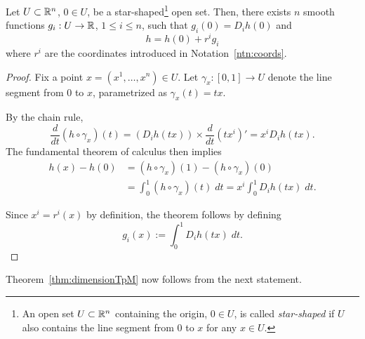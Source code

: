 \begin{lemma}\label{lem:Taylor}
  Let $U\subset\mathbb{R}^n$, $0\in U$, be a star-shaped\footnote{An open set $U\subset\mathbb{R}^n$ containing the origin, $0\in U$, is called \emph{star-shaped} if $U$ also contains the line segment from $0$ to $x$ for any $x\in U$.} open set.
  Then, there exists $n$ smooth functions $g_i: U \to \mathbb{R}$, $1\leq i \leq n$, such that $g_i(0) = D_i h(0)$ and
  \begin{equation}
    h = h(0) + r^i g_i
  \end{equation}
  where $r^i$ are the coordinates introduced in Notation~\ref{ntn:coords}.
\end{lemma}
\begin{proof}
  Fix a point $x = (x^1, \ldots, x^n) \in U$.
  Let $\gamma_x:[0,1]\to U$ denote the line segment from $0$ to $x$, parametrized as $\gamma_x(t) = tx$.

  By the chain rule,
  \begin{equation}
    \frac{d}{dt}(h \circ \gamma_x) (t) = \left(D_i h(t x)\right) \times \frac{d}{dt} (t x^i)' = x^i D_i h(t x).
  \end{equation}
  The fundamental theorem of calculus then implies
  \begin{align}
    h(x) - h(0) &= (h \circ \gamma_x)(1) - (h \circ \gamma_x)(0) \\
    &= \int_0^1 (h \circ \gamma_x)(t)\;dt = x^i \int_0^1 D_i h(tx)\; dt.
  \end{align}

  Since $x^i = r^i(x)$ by definition, the theorem follows by defining
  \begin{equation}
    g_i(x) := \int_0^1 D_i h(tx)\; dt.
  \end{equation}
\end{proof}

Theorem~\ref{thm:dimensionTpM} now follows from the next statement.

